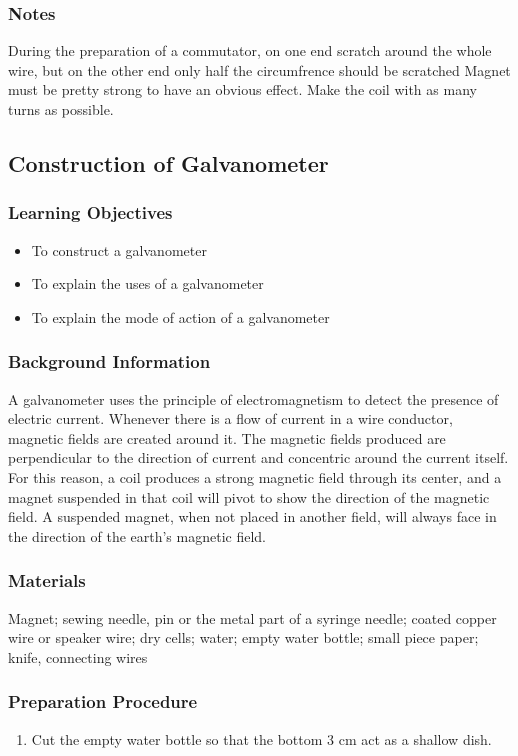 \subsubsection*{Notes}
During the preparation of a commutator, on one end scratch around the whole wire, but on the other end only half the circumfrence should be scratched
Magnet must be pretty strong to have an obvious effect. Make the coil with as many turns as possible.  

\subsection{Construction of Galvanometer}

\subsubsection*{Learning Objectives}
\begin{itemize}
\item{To construct a galvanometer}
\item{To explain the uses of a galvanometer}
\item{To explain the mode of action of a galvanometer}
\end{itemize}

\subsubsection*{Background Information}
A galvanometer uses the principle of electromagnetism to detect the presence of electric current. Whenever there is a flow of current in a wire conductor, magnetic fields are created around it. The magnetic fields produced are perpendicular to the direction of current and concentric around the current itself. For this reason, a coil produces a strong magnetic field through its center, and a magnet suspended in that coil will pivot to show the direction of the magnetic field. A suspended magnet, when not placed in another field, will always face in the direction of the earth's magnetic field.  

\subsubsection*{Materials}
Magnet; sewing needle, pin or the metal part of a syringe needle; coated copper wire or speaker wire; dry cells; water; empty water bottle; small piece paper; knife, connecting wires

\subsubsection*{Preparation Procedure}
\begin{enumerate}
\item{Cut the empty water bottle so that the bottom 3 cm act as a shallow dish.} 
\end{enumerate}

